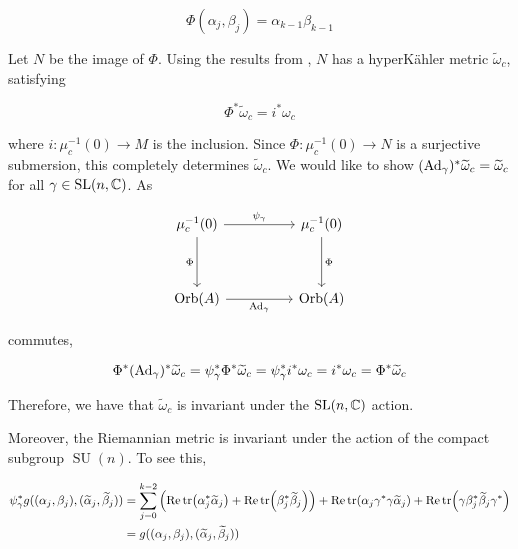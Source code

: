 \documentclass{article}
\renewcommand{\tilde}{\widetilde}
\DeclareMathOperator{\SU}{SU}
\begin{document}
\[\Phi(\alpha_j, \beta_j) = \alpha_{k-1}\beta_{k-1}\]

Let \(N\) be the image of \(\Phi\). Using the results from \cite{kobak_classical_1996}, \(N\) has a hyperK\"ahler metric \(\tilde\omega_c\), satisfying

\[\Phi^*\tilde\omega_c = i^*\omega_c\]

where \(i : \mu_c^{-1}(0) \to M\) is the inclusion. Since \(\Phi : \mu_c^{-1}(0) \to N\) is a surjective submersion, this completely determines \(\tilde\omega_c\). We would like to show \((\Ad_\gamma)^*\tilde\omega_c = \tilde\omega_c\) for all \(\gamma \in \operatorname{SL}(n, \mathbb{C})\). As

\[\begin{tikzcd}[ampersand replacement=\&]
	{\mu_c^{-1}(0)} \&\& {\mu_c^{-1}(0)} \\
	\\
	{\Orb(A)} \&\& {\Orb(A)}
	\arrow["{\Ad_\gamma}"', from=3-1, to=3-3]
	\arrow["\Phi"', from=1-1, to=3-1]
	\arrow["\Phi", from=1-3, to=3-3]
	\arrow["{\psi_\gamma}", from=1-1, to=1-3]
\end{tikzcd}\]

commutes,

\[\Phi^*(\Ad_\gamma)^*\tilde\omega_c = \psi_\gamma^*\Phi^*\tilde\omega_c = \psi_\gamma^*i^*\omega_c = i^*\omega_c = \Phi^*\tilde\omega_c\]

Therefore, we have that \(\tilde\omega_c\) is invariant under the \(\operatorname{SL}(n, \mathbb{C})\) action.

Moreover, the Riemannian metric is invariant under the action of the compact subgroup \(\SU(n)\). To see this,

\begin{align*}
    \psi_\gamma^*g((\alpha_j, \beta_j), (\tilde\alpha_j, \tilde\beta_j)) &= \sum_{j=0}^{k-2}\left(\Re\tr(\alpha_j^*\tilde\alpha_j) + \Re\tr(\beta_j^*\tilde\beta_j)\right) + \Re\tr(\alpha_j\gamma^*\gamma\tilde\alpha_j) + \Re\tr(\gamma\beta_j^*\tilde\beta_j\gamma^*) \\
    &= g((\alpha_j, \beta_j), (\tilde\alpha_j, \tilde\beta_j))
\end{align*}

\printbibliography
\end{document}
